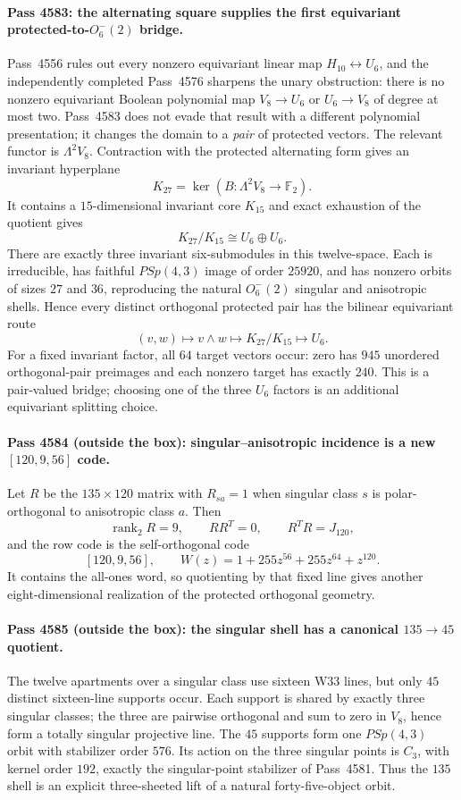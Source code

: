 \paragraph{Pass 4583: the alternating square supplies the first equivariant protected-to-$O^-_6(2)$ bridge.}
Pass~4556 rules out every nonzero equivariant linear map
$H_{10}\leftrightarrow U_6$, and the independently completed Pass~4576 sharpens
the unary obstruction: there is no nonzero equivariant Boolean polynomial map
$V_8\to U_6$ or $U_6\to V_8$ of degree at most two.  Pass~4583 does not evade
that result with a different polynomial presentation; it changes the domain to
a \emph{pair} of protected vectors.  The relevant functor is
$\Lambda^2V_8$.  Contraction with the protected alternating form gives an
invariant hyperplane
\[
 K_{27}=\ker\!\left(B:\Lambda^2V_8\to\mathbb F_2\right).
\]
It contains a $15$-dimensional invariant core $K_{15}$ and exact exhaustion of
the quotient gives
\[
 \boxed{K_{27}/K_{15}\cong U_6\oplus U_6}.
\]
There are exactly three invariant six-submodules in this twelve-space.  Each is
irreducible, has faithful $PSp(4,3)$ image of order $25920$, and has nonzero
orbits of sizes $27$ and $36$, reproducing the natural $O^-_6(2)$ singular and
anisotropic shells.  Hence every distinct orthogonal protected pair has the
bilinear equivariant route
\[
 (v,w)\longmapsto v\wedge w\longmapsto K_{27}/K_{15}
 \longmapsto U_6.
\]
For a fixed invariant factor, all $64$ target vectors occur: zero has $945$
unordered orthogonal-pair preimages and each nonzero target has exactly $240$.
This is a pair-valued bridge; choosing one of the three $U_6$ factors is an
additional equivariant splitting choice.

\paragraph{Pass 4584 (outside the box): singular--anisotropic incidence is a new $[120,9,56]$ code.}
Let $R$ be the $135\times120$ matrix with $R_{sa}=1$ when singular class $s$ is
polar-orthogonal to anisotropic class $a$.  Then
\[
 \operatorname{rank}_2R=9,\qquad RR^T=0,\qquad R^TR=J_{120},
\]
and the row code is the self-orthogonal code
\[
 \boxed{[120,9,56],\qquad
 W(z)=1+255z^{56}+255z^{64}+z^{120}.}
\]
It contains the all-ones word, so quotienting by that fixed line gives another
eight-dimensional realization of the protected orthogonal geometry.

\paragraph{Pass 4585 (outside the box): the singular shell has a canonical $135\to45$ quotient.}
The twelve apartments over a singular class use sixteen W33 lines, but only
$45$ distinct sixteen-line supports occur.  Each support is shared by exactly
three singular classes; the three are pairwise orthogonal and sum to zero in
$V_8$, hence form a totally singular projective line.  The $45$ supports form one
$PSp(4,3)$ orbit with stabilizer order $576$.  Its action on the three singular
points is $C_3$, with kernel order $192$, exactly the singular-point stabilizer
of Pass~4581.  Thus the $135$ shell is an explicit three-sheeted lift of a
natural forty-five-object orbit.

